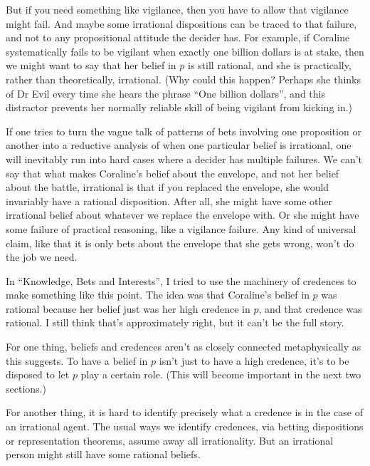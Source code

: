 \documentclass[11pt,]{book}
\begin{document}
But if you need something like vigilance, then you have to allow that vigilance might fail. And maybe some irrational dispositions can be traced to that failure, and not to any propositional attitude the decider has. For example, if Coraline systematically fails to be vigilant when exactly one billion dollars is at stake, then we might want to say that her belief in \(p\) is still rational, and she is practically, rather than theoretically, irrational. (Why could this happen? Perhaps she thinks of Dr Evil every time she hears the phrase ``One billion dollars'', and this distractor prevents her normally reliable skill of being vigilant from kicking in.)

If one tries to turn the vague talk of patterns of bets involving one proposition or another into a reductive analysis of when one particular belief is irrational, one will inevitably run into hard cases where a decider has multiple failures. We can't say that what makes Coraline's belief about the envelope, and not her belief about the battle, irrational is that if you replaced the envelope, she would invariably have a rational disposition. After all, she might have some other irrational belief about whatever we replace the envelope with. Or she might have some failure of practical reasoning, like a vigilance failure. Any kind of universal claim, like that it is only bets about the envelope that she gets wrong, won't do the job we need.

In ``Knowledge, Bets and Interests'', I tried to use the machinery of credences to make something like this point. The idea was that Coraline's belief in \(p\) was rational because her belief just was her high credence in \(p\), and that credence was rational. I still think that's approximately right, but it can't be the full story.

For one thing, beliefs and credences aren't as closely connected metaphysically as this suggests. To have a belief in \(p\) isn't just to have a high credence, it's to be disposed to let \(p\) play a certain role. (This will become important in the next two sections.)

For another thing, it is hard to identify precisely what a credence is in the case of an irrational agent. The usual ways we identify credences, via betting dispositions or representation theorems, assume away all irrationality. But an irrational person might still have some rational beliefs.
\end{document}
